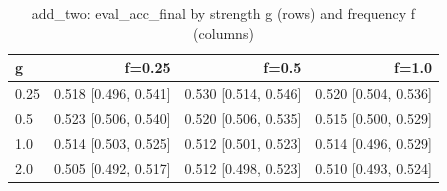 \begin{table}[t]
\centering
\small
\begin{tabular}{lrrr}
\toprule
g & f=0.25 & f=0.5 & f=1.0 \\
\midrule
0.25 & 0.518 [0.496, 0.541] & 0.530 [0.514, 0.546] & 0.520 [0.504, 0.536] \\
0.5 & 0.523 [0.506, 0.540] & 0.520 [0.506, 0.535] & 0.515 [0.500, 0.529] \\
1.0 & 0.514 [0.503, 0.525] & 0.512 [0.501, 0.523] & 0.514 [0.496, 0.529] \\
2.0 & 0.505 [0.492, 0.517] & 0.512 [0.498, 0.523] & 0.510 [0.493, 0.524] \\
\bottomrule
\end{tabular}
\caption{add\_two: eval\_acc\_final by strength g (rows) and frequency f (columns)}
\label{tab:plasticity_add_two_eval_acc_final}
\end{table}